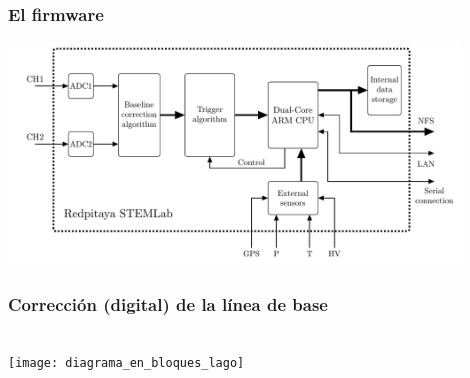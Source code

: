 \documentclass{beamer}
\begin{document}
\begin{frame}
				\frametitle{El firmware}
  \begin{block}{}
    \centering
    \includegraphics[width=0.9\textwidth]{diag_sys}
  \end{block}
\end{frame}

\begin{frame}
				\frametitle{Corrección (digital) de la línea de base}
  \begin{block}{}
    \centering
					 \\
    \texttt{[image: diagrama\_en\_bloques\_lago]}
  \end{block}
\end{frame}
\end{document}
